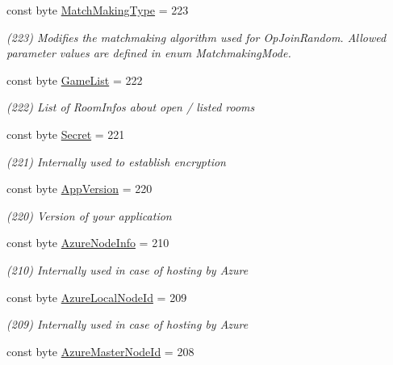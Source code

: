 \begin{DoxyCompactItemize}
const byte \hyperlink{class_exit_games_1_1_client_1_1_photon_1_1_parameter_code_aaad13b916a824219a4f7277f41f46858}{Match\+Making\+Type} = 223
\begin{DoxyCompactList}\small\item\em (223) Modifies the matchmaking algorithm used for Op\+Join\+Random. Allowed parameter values are defined in enum Matchmaking\+Mode.\end{DoxyCompactList}\item 
const byte \hyperlink{class_exit_games_1_1_client_1_1_photon_1_1_parameter_code_a901f1fba81f5c3613cd88ffb8c8ca4c1}{Game\+List} = 222
\begin{DoxyCompactList}\small\item\em (222) List of Room\+Infos about open / listed rooms\end{DoxyCompactList}\item 
const byte \hyperlink{class_exit_games_1_1_client_1_1_photon_1_1_parameter_code_ae8b26169fb98f652d3ace0899c8a13e7}{Secret} = 221
\begin{DoxyCompactList}\small\item\em (221) Internally used to establish encryption\end{DoxyCompactList}\item 
const byte \hyperlink{class_exit_games_1_1_client_1_1_photon_1_1_parameter_code_ad3fdb932852194ba542b5524c4487722}{App\+Version} = 220
\begin{DoxyCompactList}\small\item\em (220) Version of your application\end{DoxyCompactList}\item 
const byte \hyperlink{class_exit_games_1_1_client_1_1_photon_1_1_parameter_code_a3a10ea7f7cb16b61743291cd3c19300a}{Azure\+Node\+Info} = 210
\begin{DoxyCompactList}\small\item\em (210) Internally used in case of hosting by Azure\end{DoxyCompactList}\item 
const byte \hyperlink{class_exit_games_1_1_client_1_1_photon_1_1_parameter_code_aa32eb38e508a98688fbd6345be0d20eb}{Azure\+Local\+Node\+Id} = 209
\begin{DoxyCompactList}\small\item\em (209) Internally used in case of hosting by Azure\end{DoxyCompactList}\item 
const byte \hyperlink{class_exit_games_1_1_client_1_1_photon_1_1_parameter_code_a20bf98696dfb8802ccd199adfeb62978}{Azure\+Master\+Node\+Id} = 208

\end{DoxyCompactItemize}
